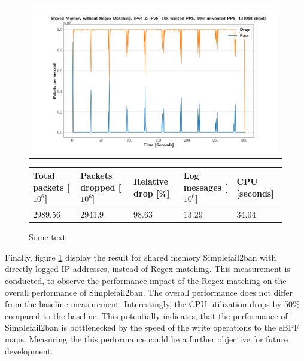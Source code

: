 \begin{figure}[!h]
	\centering
	\scriptsize
	\begin{tabular}{c}
    	\centerline{\includegraphics[width=1.2\textwidth]{images/simplefail2ban_shm_nr_ipv46_v10k_iv10m_c131068.png}}
	\end{tabular}
	\begin{tabular}{lllll}
		\toprule
		\textbf{Total packets [$10^6$]} & \textbf{Packets dropped [$10^6$]} & \textbf{Relative drop [\%]} & \textbf{Log messages [$10^6$]} & \textbf{CPU [seconds]} \\ \midrule 
		2989.56 & 2941.9 & 98.63 & 13.29 & 34.04 \\
		\bottomrule
	\end{tabular}
	\caption[Simplefail2ban, Shared Memory without Regex Matching]{Some text}
	\label{fig:simplefail2ban:shm:nr}
\end{figure}

Finally, figure \ref{fig:simplefail2ban:shm:nr} display the result for shared memory Simplefail2ban with directly logged \ac{IP} addresses, instead of \ac{Regex} matching.
This measurement is conducted, to observe the performance impact of the \ac{Regex} matching on the overall performance of Simplefail2ban. The overall performance does not differ
from the baseline measurement. Interestingly, the \ac{CPU} utilization drops by 50\% compared to the baseline. This potentially indicates, that the performance of Simplefail2ban is bottlenecked by 
the speed of the write operations to the \ac{eBPF} maps. Measuring the this performance could be a further objective for future development.   
